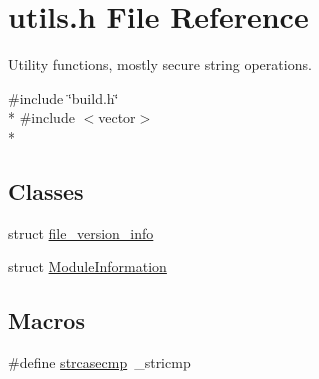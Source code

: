 \section{utils.\-h File Reference}
\label{utils_8h}


Utility functions, mostly secure string operations.  


{\ttfamily \#include \char`\"{}build.\-h\char`\"{}}\\*
{\ttfamily \#include $<$vector$>$}\\*
\subsection*{Classes}
\begin{DoxyCompactItemize}
\item 
struct \hyperlink{structfile__version__info}{file\-\_\-version\-\_\-info}
\item 
struct \hyperlink{struct_module_information}{Module\-Information}
\end{DoxyCompactItemize}
\subsection*{Macros}
\begin{DoxyCompactItemize}
\item 
\#define \hyperlink{utils_8h_ac99ec3f1036620727a68aa8c25a8963c}{strcasecmp}~\-\_\-stricmp
\end{DoxyCompactItemize}
